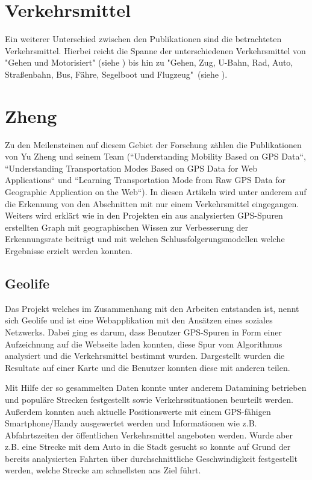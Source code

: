 \section{Verkehrsmittel}
Ein weiterer Unterschied zwischen den Publikationen sind die betrachteten Verkehrsmittel. Hierbei reicht die Spanne der unterschiedenen Verkehrsmittel von "Gehen und Motorisiert" (siehe \cite{reddy_using_2010}) bis hin zu "Gehen, Zug, U-Bahn, Rad, Auto, Straßenbahn, Bus, Fähre, Segelboot und Flugzeug"\ (siehe \cite{biljecki_transportation_2013}).

\section{Zheng}
Zu den Meilensteinen auf diesem Gebiet der Forschung zählen die Publikationen von Yu Zheng und seinem Team (``Understanding Mobility Based on GPS Data``, ``Understanding Transportation Modes Based on GPS Data for Web Applications`` und ``Learning Transportation Mode from Raw GPS Data for Geographic Application on the Web``). In diesen Artikeln wird unter anderem auf die Erkennung von den Abschnitten mit nur einem Verkehrsmittel eingegangen. Weiters wird erklärt wie in den Projekten ein aus analysierten GPS-Spuren erstellten Graph mit geographischen Wissen zur Verbesserung der Erkennungsrate beiträgt und mit welchen Schlussfolgerungsmodellen welche Ergebnisse erzielt werden konnten. 

\subsection{Geolife}
Das Projekt welches im Zusammenhang mit den Arbeiten entstanden ist, nennt sich Geolife und ist eine Webapplikation mit den Ansätzen eines soziales Netzwerks. Dabei ging es darum, dass Benutzer GPS-Spuren in Form einer Aufzeichnung auf die Webseite laden konnten, diese Spur vom Algorithmus analysiert und die Verkehrsmittel bestimmt wurden. Dargestellt wurden die Resultate auf einer Karte und die Benutzer konnten diese mit anderen teilen. 

Mit Hilfe der so gesammelten Daten konnte unter anderem Datamining betrieben und populäre Strecken festgestellt sowie Verkehrssituationen beurteilt werden. Außerdem konnten auch aktuelle Positionswerte mit einem GPS-fähigen Smartphone/Handy ausgewertet werden und Informationen wie z.B. Abfahrtszeiten der öffentlichen Verkehrsmittel angeboten werden. Wurde aber z.B. eine Strecke mit dem Auto in die Stadt gesucht so konnte auf Grund der bereits analysierten Fahrten über durchschnittliche Geschwindigkeit festgestellt werden, welche Strecke am schnellsten ans Ziel führt.

